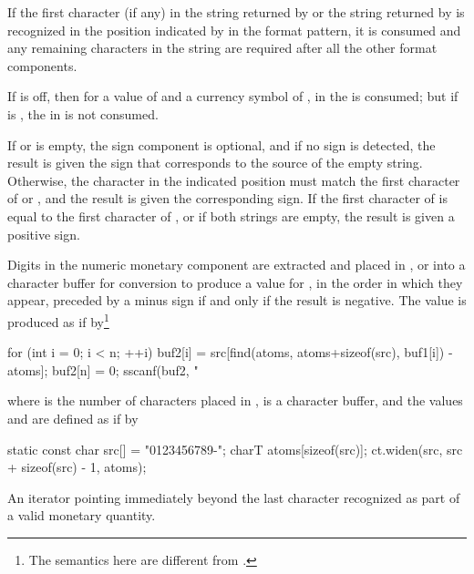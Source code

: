 \begin{itemdescr}
\pnum
If the first character (if any) in the string
returned by
or the string
returned by
is recognized in the position indicated by
in the format pattern, it is consumed and any remaining characters
in the string are required after all the other format components.
\begin{example}
If
is off, then for a
value of  and a currency symbol of ,
in  the  is consumed;
but if
is , the  in  is not consumed.
\end{example}
If
or
is empty, the sign component is optional, and if no sign is
detected, the result is given the sign that corresponds to the source
of the empty string.
Otherwise, the character in the indicated position must
match the first character of
or
,
and the result is given the corresponding sign.
If the first character of
is equal to the first character of
,
or if both strings are empty, the result is given a positive sign.

\pnum
Digits in the numeric monetary component are extracted and placed in
,
or into a character buffer
for conversion to produce a value for
,
in the order in which they appear,
preceded by a minus sign if and only if the result is negative.
The value
is produced as if by\footnote{The semantics here are different from
.}

\begin{codeblock}
for (int i = 0; i < n; ++i)
  buf2[i] = src[find(atoms, atoms+sizeof(src), buf1[i]) - atoms];
buf2[n] = 0;
sscanf(buf2, "%
\end{codeblock}

where
is the number of characters placed in
,
is a character buffer, and the values
and
are defined as if by

\begin{codeblock}
static const char src[] = "0123456789-";
charT atoms[sizeof(src)];
ct.widen(src, src + sizeof(src) - 1, atoms);
\end{codeblock}

\pnum
\returns
An iterator pointing immediately beyond the last character recognized
as part of a valid monetary quantity.
\end{itemdescr}


